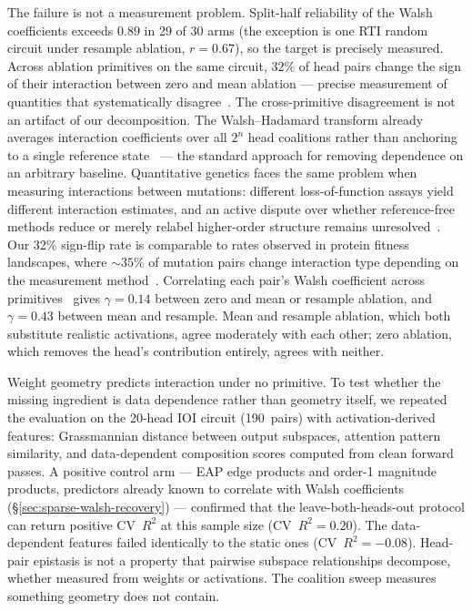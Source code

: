 The failure is not a measurement problem. Split-half reliability of the Walsh
coefficients exceeds $0.89$ in 29 of 30 arms (the exception is one RTI random
circuit under resample ablation, $r = 0.67$), so the target is precisely
measured. Across ablation primitives on the same circuit, $32\%$ of head pairs
change the sign of their interaction between zero and mean ablation --- precise
measurement of quantities that systematically
disagree~\citep{housden2017comparison}.
The cross-primitive disagreement is not an artifact of our decomposition.
The Walsh--Hadamard transform already averages interaction coefficients over
all $2^n$ head coalitions rather than anchoring to a single reference
state~\citep{poelwijk2016context,poelwijk2019learning} --- the standard
approach for removing dependence on an arbitrary baseline. Quantitative
genetics faces the same problem when measuring interactions between mutations:
different loss-of-function assays yield different interaction estimates, and an
active dispute over whether reference-free methods reduce or merely relabel
higher-order structure remains
unresolved~\citep{park2024simplicity,dupic2024protein,buda2024higher}. Our
32\% sign-flip rate is comparable to rates observed in protein fitness
landscapes, where ${\sim}35\%$ of mutation pairs change interaction type
depending on the measurement
method~\citep{fluidity2024elife,housden2017comparison}. Correlating each
pair's Walsh coefficient across primitives~\citep{ferretti2016measuring} gives
$\gamma = 0.14$ between zero and mean or resample ablation, and $\gamma = 0.43$
between mean and resample. Mean and resample ablation, which both substitute
realistic activations, agree moderately with each other; zero ablation, which
removes the head's contribution entirely, agrees with neither.

Weight geometry predicts interaction under no primitive.
To test whether the missing ingredient is data dependence rather than geometry
itself, we repeated the evaluation on the 20-head IOI circuit (190~pairs) with
activation-derived features: Grassmannian distance between output subspaces,
attention pattern similarity, and data-dependent composition scores computed
from clean forward passes. A positive control arm --- EAP edge products and
order-1 magnitude products, predictors already known to correlate with Walsh
coefficients (\S\ref{sec:sparse-walsh-recovery}) --- confirmed that the
leave-both-heads-out protocol can return positive CV~$R^2$ at this sample size
(CV~$R^2 = 0.20$). The data-dependent features failed identically to the
static ones (CV~$R^2 = {-}0.08$). Head-pair epistasis is not a property that
pairwise subspace relationships decompose, whether measured from weights or
activations. The coalition sweep measures something geometry does not contain.

